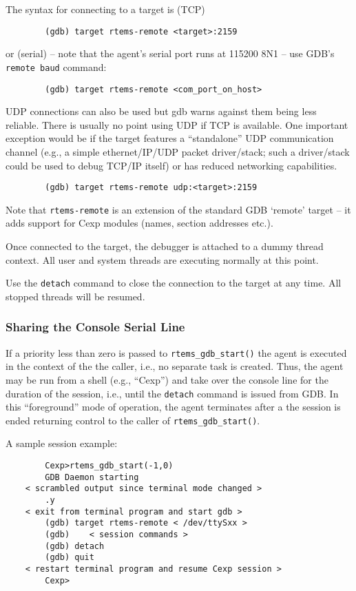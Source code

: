 \documentclass{article}
\newcommand{\cmd}[1]{{\tt #1}}
\begin{document}
	The syntax for connecting to a target is (TCP)
\begin{verbatim}
		(gdb) target rtems-remote <target>:2159
\end{verbatim}
	or (serial)
	 -- note that the agent's serial port runs at
	115200 8N1 -- use GDB's \cmd{remote baud} command:
\begin{verbatim}
		(gdb) target rtems-remote <com_port_on_host>
\end{verbatim}

	UDP connections can also be used but gdb warns against
	them being less reliable. There is usually no point
	using UDP if TCP is available. One important exception
	would be if the target features a ``standalone'' UDP
	communication channel (e.g., a simple ethernet/IP/UDP
	packet driver/stack; such a driver/stack could be
	used to debug TCP/IP itself) or has reduced networking
	capabilities.
\begin{verbatim}
		(gdb) target rtems-remote udp:<target>:2159
\end{verbatim}

	Note that \cmd{rtems-remote} is an extension of the
	standard GDB `remote' target -- it adds support
	for Cexp modules (names, section addresses etc.).

	Once connected to the target, the debugger is
	attached to a dummy thread context. All user and
	system threads are executing normally at this point.

	Use the \cmd{detach} command to close the connection
	to the target at any time. All stopped threads will
	be resumed.

\subsubsection{Sharing the Console Serial Line}
	If a priority less than zero is passed to {\verb|rtems_gdb_start()|}
    the agent is executed in the context of the the caller, i.e.,
    no separate task is created. Thus, the agent may be run from
    a shell (e.g., ``Cexp'') and take over the console line for
    the duration of the session, i.e., until the \cmd{detach}
    command is issued from GDB. In this ``foreground'' mode
    of operation, the agent terminates after a the session is ended
    returning control to the caller of {\verb|rtems_gdb_start()|}.

	A sample session example:
\begin{verbatim}
	    Cexp>rtems_gdb_start(-1,0)
	    GDB Daemon starting
	< scrambled output since terminal mode changed >
	    .y
	< exit from terminal program and start gdb >
	    (gdb) target rtems-remote < /dev/ttySxx >
	    (gdb)    < session commands >
	    (gdb) detach
	    (gdb) quit
	< restart terminal program and resume Cexp session >
	    Cexp>
\end{verbatim}
\end{document}
